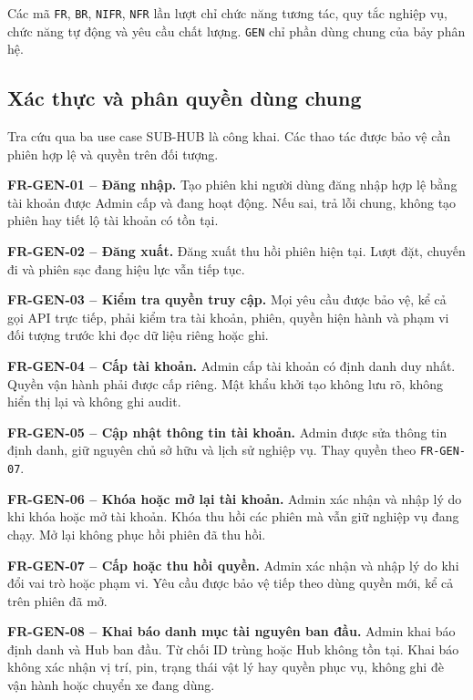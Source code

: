 Các mã \texttt{FR}, \texttt{BR}, \texttt{NIFR}, \texttt{NFR} lần lượt chỉ chức năng tương tác, quy tắc nghiệp vụ, chức năng tự động và yêu cầu chất lượng. \texttt{GEN} chỉ phần dùng chung của bảy phân hệ.

\subsection{Xác thực và phân quyền dùng chung}
\label{sec:common-access}

Tra cứu qua ba use case SUB-HUB là công khai. Các thao tác được bảo vệ cần phiên hợp lệ và quyền trên đối tượng.

\noindent\textbf{FR-GEN-01 -- Đăng nhập.} Tạo phiên khi người dùng đăng nhập hợp lệ bằng tài khoản được Admin cấp và đang hoạt động. Nếu sai, trả lỗi chung, không tạo phiên hay tiết lộ tài khoản có tồn tại.

\medskip
\noindent\textbf{FR-GEN-02 -- Đăng xuất.} Đăng xuất thu hồi phiên hiện tại. Lượt đặt, chuyến đi và phiên sạc đang hiệu lực vẫn tiếp tục.

\medskip
\noindent\textbf{FR-GEN-03 -- Kiểm tra quyền truy cập.} Mọi yêu cầu được bảo vệ, kể cả gọi API trực tiếp, phải kiểm tra tài khoản, phiên, quyền hiện hành và phạm vi đối tượng trước khi đọc dữ liệu riêng hoặc ghi.

\medskip
\noindent\textbf{FR-GEN-04 -- Cấp tài khoản.} Admin cấp tài khoản có định danh duy nhất. Quyền vận hành phải được cấp riêng. Mật khẩu khởi tạo không lưu rõ, không hiển thị lại và không ghi audit.

\medskip
\noindent\textbf{FR-GEN-05 -- Cập nhật thông tin tài khoản.} Admin được sửa thông tin định danh, giữ nguyên chủ sở hữu và lịch sử nghiệp vụ. Thay quyền theo \texttt{FR-GEN-07}.

\medskip
\noindent\textbf{FR-GEN-06 -- Khóa hoặc mở lại tài khoản.} Admin xác nhận và nhập lý do khi khóa hoặc mở tài khoản. Khóa thu hồi các phiên mà vẫn giữ nghiệp vụ đang chạy. Mở lại không phục hồi phiên đã thu hồi.

\medskip
\noindent\textbf{FR-GEN-07 -- Cấp hoặc thu hồi quyền.} Admin xác nhận và nhập lý do khi đổi vai trò hoặc phạm vi. Yêu cầu được bảo vệ tiếp theo dùng quyền mới, kể cả trên phiên đã mở.

\medskip
\noindent\textbf{FR-GEN-08 -- Khai báo danh mục tài nguyên ban đầu.} Admin khai báo định danh và Hub ban đầu. Từ chối ID trùng hoặc Hub không tồn tại. Khai báo không xác nhận vị trí, pin, trạng thái vật lý hay quyền phục vụ, không ghi đè vận hành hoặc chuyển xe đang dùng.

